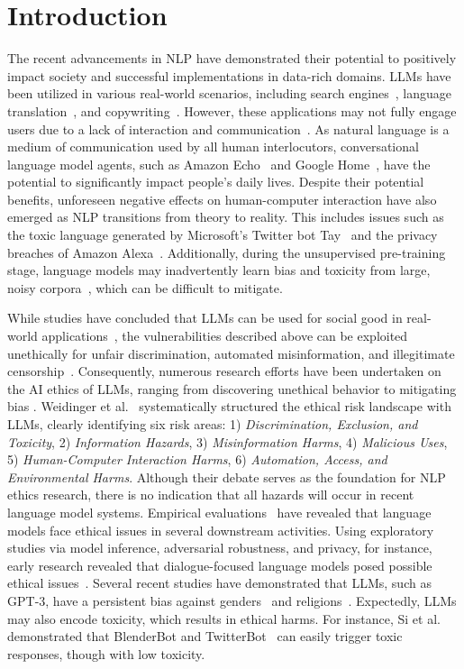 \section{Introduction}
The recent advancements in NLP have demonstrated their potential to positively impact society and successful implementations in data-rich domains. LLMs have been utilized in various real-world scenarios, including search engines~\cite{mum,meb}, language translation~\cite{team2022NoLL,palm}, and copywriting~\cite{lee2022coauthor}. However, these applications may not fully engage users due to a lack of interaction and communication~\cite{gibson2019efficiency}. As natural language is a medium of communication used by all human interlocutors, conversational language model agents, such as Amazon Echo~\cite{liptak2017amazon} and Google Home~\cite{GoogleHome}, have the potential to significantly impact people's daily lives. Despite their potential benefits, unforeseen negative effects on human-computer interaction have also emerged as NLP transitions from theory to reality. This includes issues such as the toxic language generated by Microsoft's Twitter bot Tay~\cite{wolf2017we} and the privacy breaches of Amazon Alexa~\cite{abdi2019more}. Additionally, during the unsupervised pre-training stage, language models may inadvertently learn bias and toxicity from large, noisy corpora~\cite{rae2021scaling}, which can be difficult to mitigate.

While studies have concluded that LLMs can be used for social good in real-world applications~\cite{jin2021good}, the vulnerabilities described above can be exploited unethically for unfair discrimination, automated misinformation, and illegitimate censorship~\cite{schuster2020limitations}. Consequently, numerous research efforts have been undertaken on the AI ethics of LLMs, ranging from discovering unethical behavior to mitigating bias \cite{liang2021towards}. Weidinger et al.~\cite{weidinger2021ethical} systematically structured the ethical risk landscape with LLMs, clearly identifying six risk areas: 1) \textit{Discrimination, Exclusion, and Toxicity}, 2) \textit{Information Hazards}, 3) \textit{Misinformation Harms}, 4) \textit{Malicious Uses}, 5) \textit{Human-Computer Interaction Harms}, 6) \textit{Automation, Access, and Environmental Harms}. Although their debate serves as the foundation for NLP ethics research, there is no indication that all hazards will occur in recent language model systems.
Empirical evaluations~\cite{nadeem2021stereoset,kirk2021bias,carlini2021extracting,wei2022ai,perez2022red} have revealed that language models face ethical issues in several downstream activities. Using exploratory studies via model inference, adversarial robustness, and privacy, for instance, early research revealed that dialogue-focused language models posed possible ethical issues~\cite{henderson2018ethical}. Several recent studies have demonstrated that LLMs, such as GPT-3, have a persistent bias against genders~\cite{lucy2021gender} and religions~\cite{abid2021persistent}. Expectedly, LLMs may also encode toxicity, which results in ethical harms. For instance, Si et al.~\cite{si2022so} demonstrated that BlenderBot\cite{roller2020recipes} and TwitterBot~\cite{miller2017parlai} can easily trigger toxic responses, though with low toxicity.

